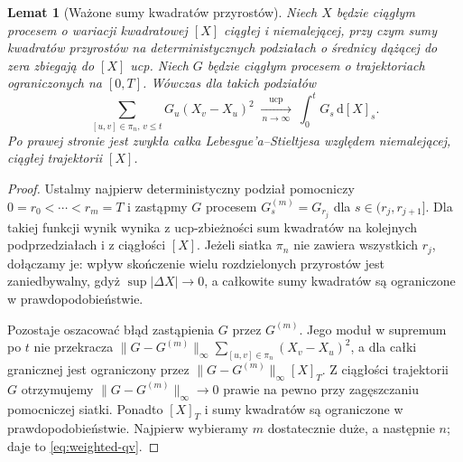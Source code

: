 \documentclass[11pt,a4paper,oneside]{report}
\numberwithin{equation}{chapter}
\theoremstyle{plain}
\newtheorem{lemat}[twierdzenie]{Lemat}
\theoremstyle{definition}
\theoremstyle{remark}
\newcommand{\dd}{\mathrm{d}}
\newcommand{\norm}[1]{\lVert #1\rVert}
\begin{document}
\begin{lemat}[Ważone sumy kwadratów przyrostów]
\label{lem:weighted-qv}
Niech $X$ będzie ciągłym procesem o wariacji kwadratowej
$[X]$ ciągłej i niemalejącej, przy czym sumy kwadratów
przyrostów na deterministycznych podziałach o średnicy
dążącej do zera zbiegają do $[X]$ ucp. Niech $G$ będzie
ciągłym procesem o trajektoriach ograniczonych na $[0,T]$.
Wówczas dla takich podziałów
\[
\sum_{[u,v]\in\pi_n,\,v\le t}G_u(X_v-X_u)^2
\ \xrightarrow[\,n\to\infty\,]{\mathrm{ucp}}\
\int_0^tG_s\,\dd[X]_s.
\tag{3.2}\label{eq:weighted-qv}
\]
Po prawej stronie jest zwykła całka Lebesgue'a--Stieltjesa
względem niemalejącej, ciągłej trajektorii $[X]$.
\end{lemat}
\begin{proof}
Ustalmy najpierw deterministyczny podział pomocniczy
$0=r_0<\cdots<r_m=T$ i zastąpmy $G$ procesem
$G^{(m)}_s=G_{r_j}$ dla $s\in(r_j,r_{j+1}]$.
Dla takiej funkcji wynik wynika z ucp-zbieżności
sum kwadratów na kolejnych podprzedziałach i z
ciągłości $[X]$. Jeżeli siatka $\pi_n$ nie zawiera
wszystkich $r_j$, dołączamy je: wpływ skończenie wielu
rozdzielonych przyrostów jest zaniedbywalny, gdyż
$\sup|\Delta X|\to0$, a całkowite sumy kwadratów są
ograniczone w prawdopodobieństwie.

Pozostaje oszacować błąd zastąpienia $G$ przez $G^{(m)}$.
Jego moduł w supremum po $t$ nie przekracza
$\norm{G-G^{(m)}}_\infty\sum_{[u,v]\in\pi_n}(X_v-X_u)^2$,
a dla całki granicznej jest ograniczony przez
$\norm{G-G^{(m)}}_\infty[X]_T$. Z ciągłości trajektorii
$G$ otrzymujemy $\norm{G-G^{(m)}}_\infty\to0$ prawie
na pewno przy zagęszczaniu pomocniczej siatki. Ponadto
$[X]_T$ i sumy kwadratów są ograniczone w prawdopodobieństwie.
Najpierw wybieramy $m$ dostatecznie duże, a następnie $n$;
daje to \eqref{eq:weighted-qv}.
\end{proof}
\end{document}
